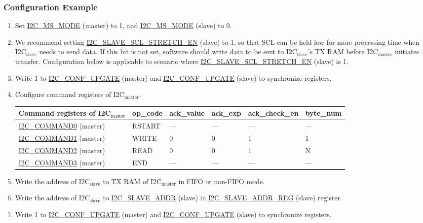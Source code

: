 \documentclass[main\_\_EN.tex]{subfiles}
\begin{document}
\subsubsection{Configuration Example}
\begin{enumerate}
\item Set \hyperref[fielddesc:I2CMSMODE]{I2C\_MS\_MODE} (master) to 1, and \hyperref[fielddesc:I2CMSMODE]{I2C\_MS\_MODE} (slave) to 0.
\item We recommend setting \hyperref[fielddesc:I2CSLAVESCLSTRETCHEN]{I2C\_SLAVE\_SCL\_STRETCH\_EN} (slave) to 1, so that SCL can be held low for more processing time when I2C$_\text{slave}$ needs to send data. If this bit is not set, software should write data to be sent to I2C$_\text{slave}$'s TX RAM before I2C$_\text{master}$ initiates transfer. Configuration below is applicable to scenario where \hyperref[fielddesc:I2CSLAVESCLSTRETCHEN]{I2C\_SLAVE\_SCL\_STRETCH\_EN} (slave) is 1. 
\item Write 1 to \hyperref[fielddesc:I2CCONFUPGATE]{I2C\_CONF\_UPGATE} (master) and \hyperref[fielddesc:I2CCONFUPGATE]{I2C\_CONF\_UPGATE} (slave) to synchronize registers.
\item Configure command registers of I2C$_\text{master}$.
\begin{longtable}{ | p{4cm} | p{2cm} | p{2cm} | p{2cm} |p{2cm} | p{2cm} |}
\hline\rowcolor{lightgray}
Command registers of I2C$_\text{master}$& op\_code & ack\_value&ack\_exp&ack\_check\_en&byte\_num  \\ \hline
\hyperref[fielddesc:I2CCOMMAND0]{I2C\_COMMAND0} (master)& RSTART& ---&---&---&---  \\ \hline
\hyperref[fielddesc:I2CCOMMAND1]{I2C\_COMMAND1} (master)& WRITE& 0&0&1&1  \\ \hline
\hyperref[fielddesc:I2CCOMMAND2]{I2C\_COMMAND2} (master)& READ& 0&0&1&N  \\ \hline
\hyperref[fielddesc:I2CCOMMAND3]{I2C\_COMMAND3} (master)& END& ---&---&---&---  \\ \hline
\end{longtable}
\item Write the address of I2C$_\text{slave}$ to TX RAM of I2C$_\text{master}$ in FIFO or non-FIFO mode.
\item Write the address of I2C$_\text{slave}$ to \hyperref[fielddesc:I2CSLAVEADDR]{I2C\_SLAVE\_ADDR} (slave) in \hyperref[regdesc:I2CSLAVEADDRREG]{I2C\_SLAVE\_ADDR\_REG} (slave) register.
\item Write 1 to \hyperref[fielddesc:I2CCONFUPGATE]{I2C\_CONF\_UPGATE} (master) and \hyperref[fielddesc:I2CCONFUPGATE]{I2C\_CONF\_UPGATE} (slave) to synchronize registers.

\end{enumerate}
\end{document}

